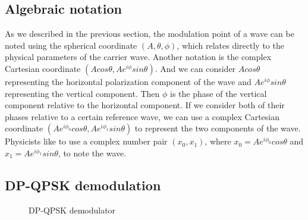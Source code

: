 \documentclass[oneside, letter, 12pt]{book}
\begin{document}
\subsection{Algebraic notation}
As we described in the previous section, the modulation point of a wave can be noted using the spherical coordinate $(A, \theta, \phi)$, which relates directly to the physical parameters of the carrier wave. Another notation is the complex Cartesian coordinate $(Acos\theta, Ae^{i\phi} sin\theta )$. And we can consider $Acos\theta$ representing the horizontal polarization component of the wave and $Ae^{i\phi} sin\theta$ representing the vertical component. Then $\phi$ is the phase of the vertical component relative to the horizontal component. If we consider both of their phases relative to a certain reference wave, we can use a complex Cartesian coordinate $(Ae^{i\phi_0} cos\theta, Ae^{i\phi_1} sin\theta )$ to represent the two components of the wave. Physicists like to use a complex number pair $(x_0, x_1)$, where $x_0 = Ae^{i\phi_0} cos\theta$ and $x_1 = Ae^{i\phi_1} sin\theta$, to note the wave.

\subsection{DP-QPSK demodulation}
\begin{figure}\label{Demodulator-DP-QPSK}
    \caption{DP-QPSK demodulator}
\end{figure}
\end{document}
